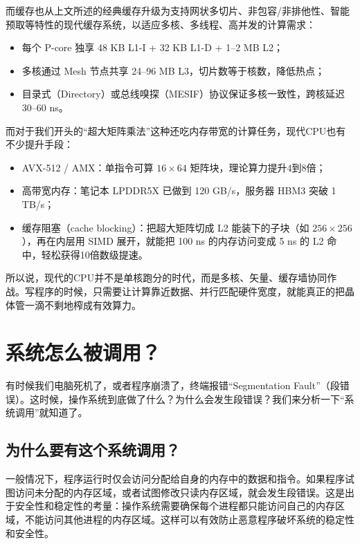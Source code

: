而缓存也从上文所述的经典缓存升级为支持网状多切片、非包容/非排他性、智能预取等特性的现代缓存系统，以适应多核、多线程、高并发的计算需求：

\begin{itemize}
\item 每个 P-core 独享 48 KB L1-I + 32 KB L1-D + 1–2 MB L2；
\item 多核通过 Mesh 节点共享 24–96 MB L3，切片数等于核数，降低热点；
\item 目录式（Directory）或总线嗅探（MESIF）协议保证多核一致性，跨核延迟 30–60 ns。
\end{itemize}

而对于我们开头的“超大矩阵乘法”这种还吃内存带宽的计算任务，现代CPU也有不少提升手段：

\begin{itemize}
\item AVX-512 / AMX：单指令可算 $16\times 64$ 矩阵块，理论算力提升4到8倍；
\item 高带宽内存：笔记本 LPDDR5X 已做到 120 GB/s，服务器 HBM3 突破 1 TB/s；
\item 缓存阻塞（cache blocking）：把超大矩阵切成 L2 能装下的子块（如 $256 \times 256$），再在内层用 SIMD 展开，就能把 100 ns 的内存访问变成 5 ns 的 L2 命中，轻松获得10倍数级提速。
\end{itemize}

所以说，现代的CPU并不是单核跑分的时代，而是多核、矢量、缓存墙协同作战。写程序的时候，只需要让计算靠近数据、并行匹配硬件宽度，就能真正的把晶体管一滴不剩地榨成有效算力。

\section{系统怎么被调用？}

有时候我们电脑死机了，或者程序崩溃了，终端报错“Segmentation Fault”（段错误）。这时候，操作系统到底做了什么？为什么会发生段错误？我们来分析一下“系统调用”就知道了。

\subsection{为什么要有这个系统调用？}

一般情况下，程序运行时仅会访问分配给自身的内存中的数据和指令。如果程序试图访问未分配的内存区域，或者试图修改只读内存区域，就会发生段错误。这是出于安全性和稳定性的考量：操作系统需要确保每个进程都只能访问自己的内存区域，不能访问其他进程的内存区域。这样可以有效防止恶意程序破坏系统的稳定性和安全性。

